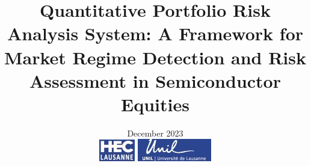 \documentclass[a4paper, 12pt, oneside]{Thesis}
\begin{document}
\frontmatter	  %

\title{Quantitative Portfolio Risk Analysis System: A Framework for Market Regime Detection and Risk Assessment in Semiconductor Equities}
\addresses{\groupname\\\deptname\\\univname}
\date{December 2023\\
\vspace*{3cm}
\includegraphics[trim= 0.1cm 0cm 0cm 0cm,clip,scale=1]{logoHEC.jpg}
\hfill
\includegraphics[trim= 0.1cm 0cm 0cm 0cm,clip,scale=1]{logoUNIL.jpg}
}


\maketitle


\fancyhead{}  %
\rhead{\thepage}  %
\lhead{}  %

\pagestyle{fancy}  %
\end{document}
